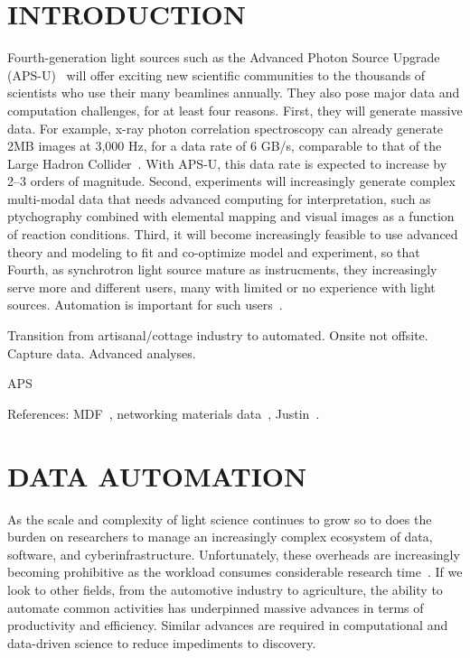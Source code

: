 \documentclass{aip-cp}
\newcommand\ian[1]{}
\newcommand\ian[1]{{\color{red}[Ian: #1]}}
\begin{document}
\ian{Potential authors: Tekin Bicer, Ben Blaiszik, Kyle Chard, Ryan Chard, Logan Ward, Justin Wozniak, ...}


\section{INTRODUCTION}

Fourth-generation light sources such as the Advanced Photon Source Upgrade (APS-U)~\cite{APSU} will offer exciting new
scientific communities to the thousands of scientists who use their many beamlines annually.
They also pose major data and computation challenges, for at least four reasons.
First, they will generate massive data. 
For example, x-ray photon correlation spectroscopy can already generate 2MB images at 3,000 Hz,
for a data rate of 6 GB/s, comparable to that of the Large Hadron Collider~\cite{lhcrate}.
With APS-U, this data rate is expected to increase by 2--3 orders of magnitude.
Second, experiments will increasingly generate complex multi-modal data that needs advanced computing
for interpretation, such as ptychography combined with 
elemental mapping and visual images as a function of reaction conditions.
Third, it will become increasingly feasible to use advanced theory and modeling to fit and co-optimize 
model and experiment, so that 
Fourth, as synchrotron light source mature as instrucments, they increasingly serve more and different users,
many with limited or no experience with light sources. 
Automation is important for such users~\cite{hiraki2008high,toby2009management}.


Transition from artisanal/cottage industry to automated. Onsite not offsite. Capture data. Advanced analyses.

APS~\cite{toby2015practices}

References: MDF~\cite{MDF2016}, networking materials data~\cite{foster2015networking}, Justin~\cite{wozniak2015big}.


\section{DATA AUTOMATION}

\ian{Big picture thoughts I guess.}

As the scale and complexity of light science continues to grow so to does the burden on
researchers to manage an increasingly complex ecosystem of data, software, and cyberinfrastructure. 
Unfortunately, these overheads are increasingly becoming prohibitive as the workload consumes
considerable research time~\cite{}. If we look to other fields, from the automotive industry
to agriculture, the ability to automate common activities has underpinned massive advances
in terms of productivity and efficiency. Similar advances are required in computational
and data-driven science to reduce impediments to discovery. 
\end{document}
